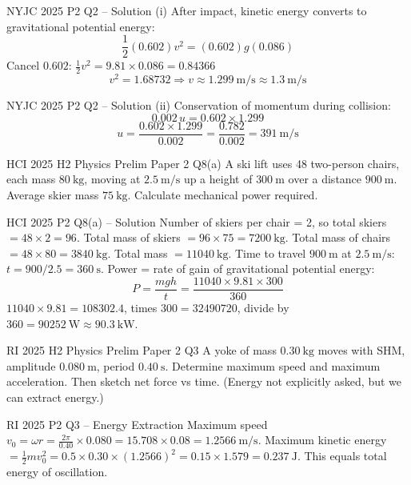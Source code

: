 \documentclass[11pt]{beamer}
\begin{document}
\begin{frame}{NYJC 2025 P2 Q2 – Solution (i)}
After impact, kinetic energy converts to gravitational potential energy:
\[ \frac12 (0.602) v^2 = (0.602) g (0.086) \]
Cancel $0.602$: $\frac12 v^2 = 9.81\times0.086 = 0.84366$
\[ v^2 = 1.68732 \Rightarrow v \approx 1.299\ \mathrm{m/s} \approx 1.3\ \mathrm{m/s} \]
\end{frame}

\begin{frame}{NYJC 2025 P2 Q2 – Solution (ii)}
Conservation of momentum during collision:
\[ 0.002\, u = 0.602 \times 1.299 \]
\[ u = \frac{0.602\times1.299}{0.002} = \frac{0.782}{0.002} = 391\ \mathrm{m/s} \]
\end{frame}

\begin{frame}[shrink=15]{HCI 2025 H2 Physics Prelim Paper 2 Q8(a)}
A ski lift uses 48 two-person chairs, each mass $80\ \mathrm{kg}$, moving at $2.5\ \mathrm{m/s}$ up a height of $300\ \mathrm{m}$ over a distance $900\ \mathrm{m}$. Average skier mass $75\ \mathrm{kg}$. Calculate mechanical power required.
\end{frame}

\begin{frame}{HCI 2025 P2 Q8(a) – Solution}
Number of skiers per chair = 2, so total skiers $= 48\times2 = 96$.
Total mass of skiers $= 96\times75 = 7200\ \mathrm{kg}$. Total mass of chairs $= 48\times80 = 3840\ \mathrm{kg}$. Total mass $= 11040\ \mathrm{kg}$.
Time to travel $900\ \mathrm{m}$ at $2.5\ \mathrm{m/s}$: $t = 900/2.5 = 360\ \mathrm{s}$.
Power = rate of gain of gravitational potential energy:
\[ P = \frac{mgh}{t} = \frac{11040\times9.81\times300}{360} \]
$11040\times9.81 = 108302.4$, times $300 = 32490720$, divide by $360 = 90252\ \mathrm{W} \approx 90.3\ \mathrm{kW}$.
\end{frame}

\begin{frame}[shrink=15]{RI 2025 H2 Physics Prelim Paper 2 Q3}
A yoke of mass $0.30\ \mathrm{kg}$ moves with SHM, amplitude $0.080\ \mathrm{m}$, period $0.40\ \mathrm{s}$. Determine maximum speed and maximum acceleration. Then sketch net force vs time. (Energy not explicitly asked, but we can extract energy.)
\end{frame}

\begin{frame}{RI 2025 P2 Q3 – Energy Extraction}
Maximum speed $v_0 = \omega r = \frac{2\pi}{0.40}\times0.080 = 15.708\times0.08 = 1.2566\ \mathrm{m/s}$.
Maximum kinetic energy $= \frac12 m v_0^2 = 0.5\times0.30\times(1.2566)^2 = 0.15\times1.579 = 0.237\ \mathrm{J}$.
This equals total energy of oscillation.
\end{frame}
\end{document}
